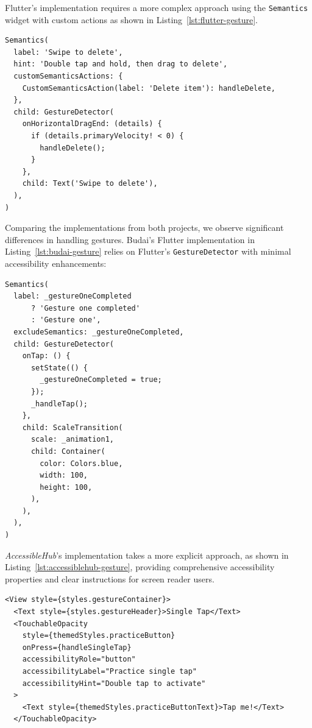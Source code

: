 {\FloatBarrier

Flutter's implementation requires a more complex approach using the \texttt{Semantics} widget with custom actions as shown in Listing~\ref{lst:flutter-gesture}.

\begin{lstlisting}[style=DartStyle, caption=Accessible gesture handler in Flutter, label=lst:flutter-gesture]
Semantics(
  label: 'Swipe to delete',
  hint: 'Double tap and hold, then drag to delete',
  customSemanticsActions: {
    CustomSemanticsAction(label: 'Delete item'): handleDelete,
  },
  child: GestureDetector(
    onHorizontalDragEnd: (details) {
      if (details.primaryVelocity! < 0) {
        handleDelete();
      }
    },
    child: Text('Swipe to delete'),
  ),
)
\end{lstlisting}

\pagebreak

Comparing the implementations from both projects, we observe significant differences in handling gestures. Budai's Flutter implementation in Listing~\ref{lst:budai-gesture} relies on Flutter's \texttt{GestureDetector} with minimal accessibility enhancements:

\begin{lstlisting}[style=DartStyle, caption=Gesture handling in Budai's Flutter implementation, label=lst:budai-gesture]
Semantics(
  label: _gestureOneCompleted 
      ? 'Gesture one completed' 
      : 'Gesture one',
  excludeSemantics: _gestureOneCompleted,
  child: GestureDetector(
    onTap: () {
      setState(() {
        _gestureOneCompleted = true;
      });
      _handleTap();
    },
    child: ScaleTransition(
      scale: _animation1,
      child: Container(
        color: Colors.blue,
        width: 100,
        height: 100,
      ),
    ),
  ),
)
\end{lstlisting}

\pagebreak

\textit{AccessibleHub}'s implementation takes a more explicit approach, as shown in Listing~\ref{lst:accessiblehub-gesture}, providing comprehensive accessibility properties and clear instructions for screen reader users.

\begin{lstlisting}[style=ReactNativeStyle, caption=Gesture handling in \textit{AccessibleHub}'s React Native implementation, label=lst:accessiblehub-gesture]
<View style={styles.gestureContainer}>
  <Text style={styles.gestureHeader}>Single Tap</Text>
  <TouchableOpacity
    style={themedStyles.practiceButton}
    onPress={handleSingleTap}
    accessibilityRole="button"
    accessibilityLabel="Practice single tap"
    accessibilityHint="Double tap to activate"
  >
    <Text style={themedStyles.practiceButtonText}>Tap me!</Text>
  </TouchableOpacity>
  

\end{lstlisting}}

